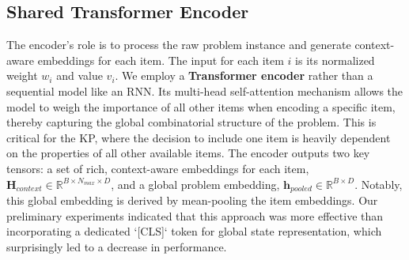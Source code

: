 \subsection{Shared Transformer Encoder}
The encoder's role is to process the raw problem instance and generate context-aware embeddings for each item.
The input for each item \(i\) is its normalized weight \(w_i\) and value \(v_i\).
We employ a \textbf{Transformer encoder} rather than a sequential model like an RNN.
Its multi-head self-attention mechanism allows the model to weigh the importance of all other items when encoding a specific item, thereby capturing the global combinatorial structure of the problem.
This is critical for the KP, where the decision to include one item is heavily dependent on the properties of all other available items.
The encoder outputs two key tensors: a set of rich, context-aware embeddings for each item, \(\mathbf{H}_{context} \in \mathbb{R}^{B \times N_{max} \times D}\), and a global problem embedding, \(\mathbf{h}_{pooled} \in \mathbb{R}^{B \times D}\). Notably, this global embedding is derived by mean-pooling the item embeddings. Our preliminary experiments indicated that this approach was more effective than incorporating a dedicated `[CLS]` token for global state representation, which surprisingly led to a decrease in performance.


